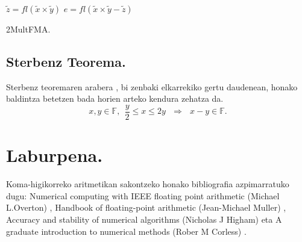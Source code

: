 \begin{algorithm}[H]
 \BlankLine
 {$\tilde{z}=fl(\tilde{x}\times\tilde{y})$\;
  $e=fl(\tilde{x}\times\tilde{y}- \tilde{z})$\;
 }
 \BlankLine
 \caption{2MultFMA.}
 \label{alg:2MultFMA}
\end{algorithm}

\subsection*{Sterbenz Teorema.}
Sterbenz teoremaren arabera \cite{Sterbenz1973}, bi zenbaki elkarrekiko  gertu daudenean, honako baldintza betetzen bada horien arteko kendura zehatza da.
\begin{equation}
\label{eq:4311}
x,y \in \mathbb{F}, \ \ \frac{y}{2}\leq x \leq 2y \ \ \ \Rightarrow \ \ \ x-y\in \mathbb{F}.
\end{equation}


\section{Laburpena.}

Koma-higikorreko aritmetikan sakontzeko honako bibliografia azpimarratuko dugu: Numerical computing with IEEE floating point arithmetic (Michael L.Overton) \cite{Overton2001}, Handbook of floating-point arithmetic (Jean-Michael Muller) \cite{Muller2009}, Accuracy and stability of numerical algorithms (Nicholas J Higham) \cite{Higham2002} eta A graduate introduction to numerical methods (Rober M Corless) \cite{Corless2013}.

